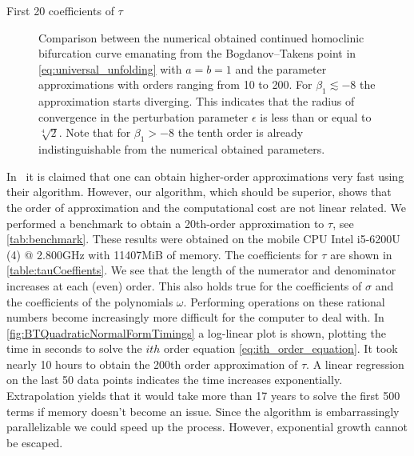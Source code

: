 \begin{table}
\label{table:tauCoeffients}
\centering
\def\arraystretch{1.5}
    \caption{First 20 coefficients of $\tau$}
\end{table}

\begin{figure}[ht!]
\caption{Comparison between the numerical obtained continued homoclinic
    bifurcation curve emanating from the Bogdanov--Takens point in
    \cref{eq:universal_unfolding} with $a=b=1$ and the parameter approximations
    with orders ranging from 10 to 200.  For $\beta_1 \lesssim -8$ the
    approximation starts diverging. This indicates that the radius of
    convergence in the perturbation parameter $\epsilon$ is less than or equal
    to $\sqrt[4]{2}$. Note that for $\beta_1 > -8$ the tenth order is
    already indistinguishable from the numerical obtained parameters.}
\label{fig:BTQuadraticNormalFormApproximations}
\end{figure}

In~\cite{Algaba_2019} it is claimed that one can obtain higher-order
approximations very fast using their algorithm. However, our algorithm, which
should be superior, shows that the order of approximation and the computational
cost are not linear related. We performed a benchmark to obtain a 20th-order
approximation to $\tau$, see \cref{tab:benchmark}.
These results were obtained on the mobile CPU Intel i5-6200U (4) @ 2.800GHz
with 11407MiB of memory. The coefficients for $\tau$ are shown in
\cref{table:tauCoeffients}. We see that the length of the numerator and
denominator increases at each (even) order. This also holds true for the
coefficients of $\sigma$ and the coefficients of the polynomials $\omega$.
Performing operations on these rational numbers become increasingly more
difficult for the computer to deal with. In
\cref{fig:BTQuadraticNormalFormTimings} a log-linear plot is shown, plotting
the time in seconds to solve the $ith$ order equation
\cref{eq:ith_order_equation}. It took nearly 10 hours to obtain the 200th order
approximation of $\tau$. A linear regression on the last 50 data points
indicates the time increases exponentially. Extrapolation yields that it would
take more than 17 years to solve the first 500 terms if memory doesn't become
an issue. Since the algorithm is embarrassingly parallelizable we could speed
up the process. However, exponential growth cannot be escaped.


